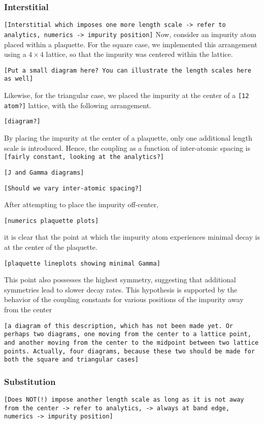 \documentclass[aps,pra,superscriptaddress,twocolumn]{revtex4-1}
\newcommand{\commentSB}[1]{\texttt{\color{blue}[#1]}}
\newcommand{\commentSO}[1]{\texttt{\color{orange}[#1]}}
\begin{document}
\subsubsection{Interstitial}
\commentSO{Interstitial which imposes one more length scale -> refer to analytics, numerics -> impurity position}
Now, consider an impurity atom placed within a plaquette. For the square case, we implemented this arrangement using a $4\times 4$ lattice, so that the impurity was centered within the lattice. 

\commentSB{Put a small diagram here? You can illustrate the length scales here as well}

Likewise, for the triangular case, we placed the impurity at the center of a \commentSB{12 atom?} lattice, with the following arrangement. 

\commentSB{diagram?}

By placing the impurity at the center of a plaquette, only one additional length scale is introduced. Hence, the coupling as a function of inter-atomic spacing is \commentSB{fairly constant, looking at the analytics?} 

\commentSB{J and Gamma diagrams}

\commentSB{Should we vary inter-atomic spacing?}

After attempting to place the impurity off-center, 

\commentSB{numerics plaquette plots}

it is clear that the point at which the impurity atom experiences minimal decay is at the center of the plaquette. 

\commentSB{plaquette lineplots showing minimal Gamma}

This point also possesses the highest symmetry, suggesting that additional symmetries lead to slower decay rates. This hypothesis is supported by the behavior of the coupling constants for various positions of the impurity away from the center 

\commentSB{a diagram of this description, which has not been made yet. Or perhaps two diagrams, one moving from the center to a lattice point, and another moving from the center to the midpoint between two lattice points. Actually, four diagrams, because these two should be made for both the square and triangular cases}


\subsubsection{Substitution}
\commentSO{Does NOT(!) impose another length scale as long as it is not away from the center -> refer to analytics, -> always at band edge, numerics -> impurity position}
\end{document}
